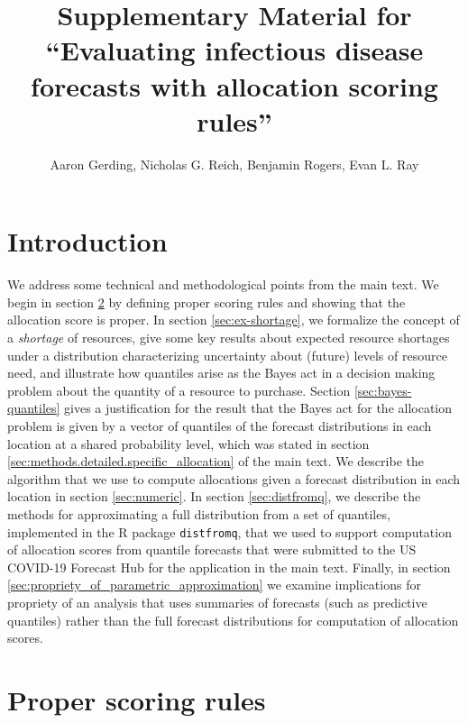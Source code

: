 \documentclass{article}
\title{Supplementary Material for ``Evaluating infectious disease forecasts with allocation scoring rules''}
\author{Aaron Gerding, Nicholas G. Reich, Benjamin Rogers, Evan L. Ray}
\begin{document}
\newcommand{\del}[2]{\frac{\partial {#1} }{\partial {#2}} }
\newcommand{\dby}[2]{\frac{d {#1} }{d {#2}} }
\newcommand{\sbar}{\overline{s}}

\newtheorem{proposition}{Proposition}

\theoremstyle{remark}
\newtheorem*{remark}{Remark}

\maketitle

\tableofcontents

\section{Introduction}
\label{sec:intro}

We address some technical and methodological points from the main text. We begin in section \ref{sec:proper} by defining proper scoring rules and showing that the allocation score is proper. In section \ref{sec:ex-shortage}, we formalize the concept of a \emph{shortage} of resources, give some key results about expected resource shortages under a distribution characterizing uncertainty about (future) levels of resource need, and illustrate how quantiles arise as the Bayes act in a decision making problem about the quantity of a resource to purchase. Section \ref{sec:bayes-quantiles} gives a justification for the result that the Bayes act for the allocation problem is given by a vector of quantiles of the forecast distributions in each location at a shared probability level, which was stated in section \ref{sec:methods.detailed.specific_allocation} of the main text. We describe the algorithm that we use to compute allocations given a forecast distribution in each location in section \ref{sec:numeric}. In section \ref{sec:distfromq}, we describe the methods for approximating a full distribution from a set of quantiles, implemented in the R package \verb`distfromq`, that we used to support computation of allocation scores from quantile forecasts that were submitted to the US COVID-19 Forecast Hub for the application in the main text. Finally, in section \ref{sec:propriety_of_parametric_approximation} we examine implications for propriety of an analysis that uses summaries of forecasts (such as predictive quantiles) rather than the full forecast distributions for computation of allocation scores.

\section{Proper scoring rules}
\label{sec:proper}
\end{document}
